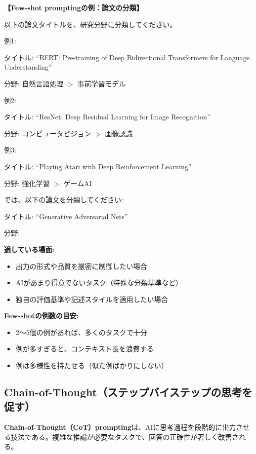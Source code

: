 \begin{promptbox}
\textbf{【Few-shot promptingの例：論文の分類】}

以下の論文タイトルを、研究分野に分類してください。

例1:

タイトル: ``BERT: Pre-training of Deep Bidirectional Transformers for Language Understanding''

分野: 自然言語処理 $>$ 事前学習モデル

例2:

タイトル: ``ResNet: Deep Residual Learning for Image Recognition''

分野: コンピュータビジョン $>$ 画像認識

例3:

タイトル: ``Playing Atari with Deep Reinforcement Learning''

分野: 強化学習 $>$ ゲームAI

では、以下の論文を分類してください:

タイトル: ``Generative Adversarial Nets''

分野:
\end{promptbox}

\textbf{適している場面:}
\begin{itemize}
\item 出力の形式や品質を厳密に制御したい場合
\item AIがあまり得意でないタスク（特殊な分類基準など）
\item 独自の評価基準や記述スタイルを適用したい場合
\end{itemize}

\textbf{Few-shotの例数の目安:}
\begin{itemize}
\item 2〜5個の例があれば、多くのタスクで十分
\item 例が多すぎると、コンテキスト長を浪費する
\item 例は多様性を持たせる（似た例ばかりにしない）
\end{itemize}

\subsection{Chain-of-Thought（ステップバイステップの思考を促す）}

\textbf{Chain-of-Thought（CoT）prompting}は、AIに思考過程を段階的に出力させる技法である\cite{Wei2022ChainOfThought}。複雑な推論が必要なタスクで、回答の正確性が著しく改善される。

